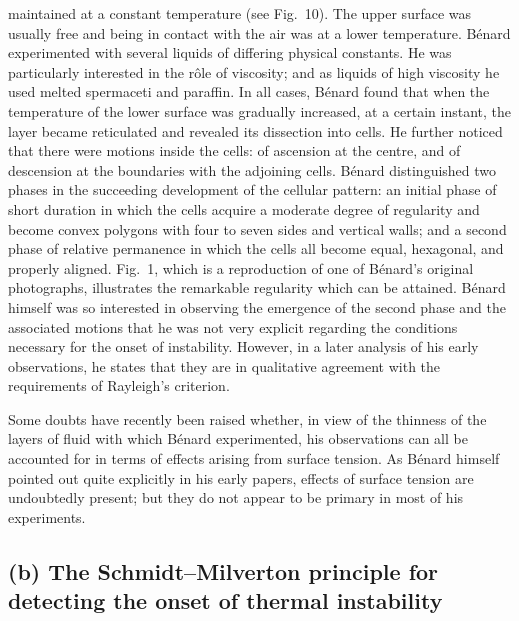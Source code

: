\noindent
maintained at a constant temperature (see Fig.~10).  The upper surface
was usually free and being in contact with the air was at a lower temperature.
B\'enard experimented with several liquids of differing physical
constants.  He was particularly interested in the r\^ole of viscosity; and
as liquids of high viscosity he used melted spermaceti and paraffin.  In
all cases, B\'enard found that when the temperature of the lower surface
was gradually increased, at a certain instant, the layer became reticulated
and revealed its dissection into cells.  He further noticed that there were
motions inside the cells: of ascension at the centre, and of descension
at the boundaries with the adjoining cells.  B\'enard distinguished two
phases in the succeeding development of the cellular pattern: an initial
phase of short duration in which the cells acquire a moderate degree
of regularity and become convex polygons with four to seven sides and
vertical walls; and a second phase of relative permanence in which the
cells all become equal, hexagonal, and properly aligned.  Fig.~1, which is
a reproduction of one of B\'enard's original photographs, illustrates the
remarkable regularity which can be attained.  B\'enard himself was so
interested in observing the emergence of the second phase and the
associated motions that he was not very explicit regarding the conditions
necessary for the onset of instability.  However, in a later analysis of his
early observations, he states that they are in qualitative agreement with
the requirements of Rayleigh's criterion.

Some doubts have recently been raised whether, in view of the thinness
of the layers of fluid with which B\'enard experimented, his observations
can all be accounted for in terms of effects arising from surface
tension.  As B\'enard himself pointed out quite explicitly in his early papers,
effects of surface tension are undoubtedly present; but they do not
appear to be primary in most of his experiments.


\subsection*{(b) The Schmidt--Milverton principle for detecting the onset of thermal instability}

